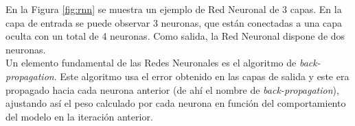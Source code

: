 En la Figura \ref{fig:rnn} se muestra un ejemplo de Red Neuronal de 3 capas. En la capa de entrada se puede observar 3 neuronas, que están conectadas a una capa oculta con un total de 4 neuronas. Como salida, la Red Neuronal dispone de dos neuronas.\\
\linebreak
Un elemento fundamental de las Redes Neuronales es el algoritmo de \textit{back-propagation}. Este algoritmo usa el error obtenido en las capas de salida y este era propagado hacia cada neurona anterior (de ahí el nombre de \textit{back-propagation}), ajustando así el peso calculado por cada neurona en función del comportamiento del modelo en la iteración anterior.


